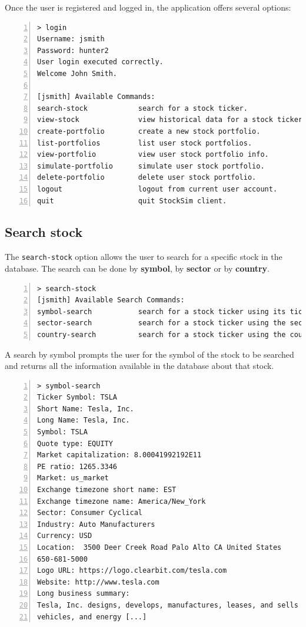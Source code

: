 Once the user is registered and logged in, the application offers several options:

\begin{lstlisting}[basicstyle=\footnotesize\ttfamily,language={},numbers=left,keepspaces=true,tabsize=4,
numberstyle=\footnotesize,numbersep=8pt,frame=single]
> login
Username: jsmith
Password: hunter2
User login executed correctly.
Welcome John Smith.

[jsmith] Available Commands:
search-stock			search for a stock ticker.              
view-stock				view historical data for a stock ticker.
create-portfolio		create a new stock portfolio.           
list-portfolios			list user stock portfolios.             
view-portfolio			view user stock portfolio info.         
simulate-portfolio		simulate user stock portfolio.          
delete-portfolio		delete user stock portfolio.            
logout					logout from current user account.       
quit					quit StockSim client.   
\end{lstlisting}

\subsection{Search stock}
The \texttt{search-stock} option allows the user to search for a specific stock in the database. The search can be done by \textbf{symbol}, by \textbf{sector} or by \textbf{country}.\\

\begin{lstlisting}[basicstyle=\footnotesize\ttfamily,language={},numbers=left,keepspaces=true,tabsize=4,
numberstyle=\footnotesize,numbersep=8pt,frame=single]
> search-stock
[jsmith] Available Search Commands:
symbol-search			search for a stock ticker using its ticker.
sector-search			search for a stock ticker using the sector.
country-search			search for a stock ticker using the country.
\end{lstlisting}
A search by symbol prompts the user for the symbol of the stock to be searched and returns all the information available in the database about that stock.
\begin{lstlisting}[basicstyle=\footnotesize\ttfamily,language={},numbers=left,keepspaces=true,tabsize=4,
numberstyle=\footnotesize,numbersep=8pt,frame=single]
> symbol-search
Ticker Symbol: TSLA
Short Name: Tesla, Inc.
Long Name: Tesla, Inc.
Symbol: TSLA
Quote type: EQUITY
Market capitalization: 8.00041992192E11
PE ratio: 1265.3346
Market: us_market
Exchange timezone short name: EST
Exchange timezone name: America/New_York
Sector: Consumer Cyclical
Industry: Auto Manufacturers
Currency: USD
Location:  3500 Deer Creek Road Palo Alto CA United States
650-681-5000
Logo URL: https://logo.clearbit.com/tesla.com
Website: http://www.tesla.com
Long business summary:
Tesla, Inc. designs, develops, manufactures, leases, and sells electric
vehicles, and energy [...]

\end{lstlisting}

